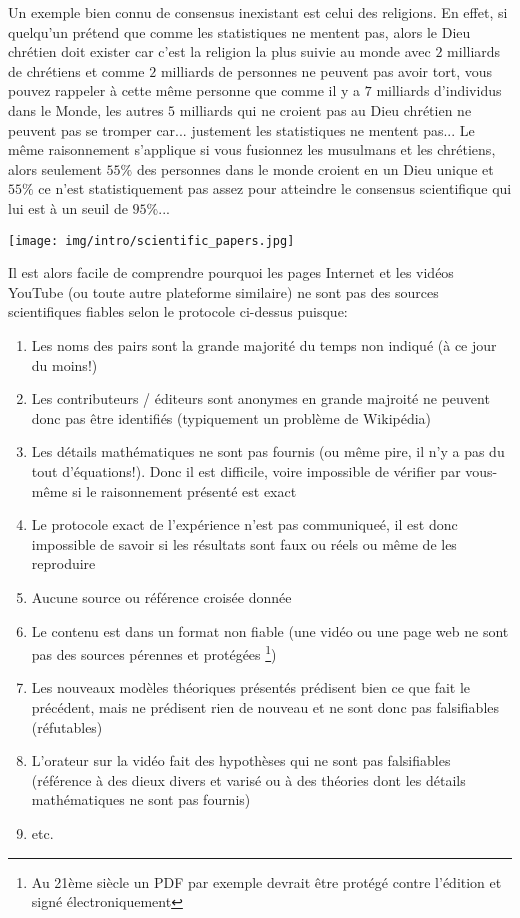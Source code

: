 	Un exemple bien connu de consensus inexistant est celui des religions. En effet, si quelqu'un prétend que comme les statistiques ne mentent pas, alors le Dieu chrétien doit exister car c'est la religion la plus suivie au monde avec $2$ milliards de chrétiens et comme $2$ milliards de personnes ne peuvent pas avoir tort, vous pouvez rappeler à cette même personne que comme il y a $7$ milliards d'individus dans le Monde, les autres $5$ milliards qui ne croient pas au Dieu chrétien ne peuvent pas se tromper car... justement les statistiques ne mentent pas... Le même raisonnement s'applique si vous fusionnez les musulmans et les chrétiens, alors seulement $55\%$ des personnes dans le monde croient en un Dieu unique et $55\% $ ce n'est statistiquement pas assez pour atteindre le consensus scientifique qui lui est à un seuil de $95\%$...
	\begin{center}
		\texttt{[image: img/intro/scientific\_papers.jpg]}
	\end{center}
	Il est alors facile de comprendre pourquoi les pages Internet et les vidéos YouTube (ou toute autre plateforme similaire) ne sont pas des sources scientifiques fiables selon le protocole ci-dessus puisque:
	\begin{enumerate}
	   \item Les noms des pairs sont la grande majorité du temps non indiqué (à ce jour du moins!)
	   
	   \item Les contributeurs / éditeurs sont anonymes en grande majroité ne peuvent donc pas être identifiés (typiquement un problème de Wikipédia)
	   
	   \item Les détails mathématiques ne sont pas fournis (ou même pire, il n'y a pas du tout d'équations!). Donc il est difficile, voire impossible de vérifier par vous-même si le raisonnement présenté est exact
	   
	   \item Le protocole exact de l'expérience n'est pas communiqueé, il est donc impossible de savoir si les résultats sont faux ou réels ou même de les reproduire
	   
	   \item Aucune source ou référence croisée donnée
	   
	   \item Le contenu est dans un format non fiable (une vidéo ou une page web ne sont pas des sources pérennes et protégées \footnote{Au 21ème siècle un PDF par exemple devrait être protégé contre l'édition et signé électroniquement})
	   
	   \item Les nouveaux modèles théoriques présentés prédisent bien ce que fait le précédent, mais ne prédisent rien de nouveau et ne sont donc pas falsifiables (réfutables)
	   
	   \item L'orateur sur la vidéo fait des hypothèses qui ne sont pas falsifiables (référence à des dieux divers et varisé ou à des théories dont les détails mathématiques ne sont pas fournis)
	   
	   \item etc.
	\end{enumerate}
